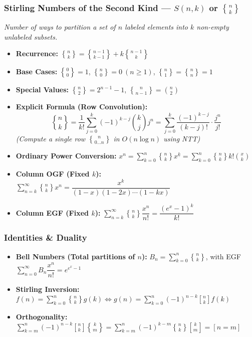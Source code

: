 \subsubsection*{Stirling Numbers of the Second Kind --- $S(n, k)$ or $\genfrac{\{}{\}}{0pt}{}{n}{k}$}
\textit{Number of ways to partition a set of $n$ labeled elements into $k$ non-empty unlabeled subsets.}
\begin{itemize}
    \item \textbf{Recurrence:} $\genfrac{\{}{\}}{0pt}{}{n}{k} = \genfrac{\{}{\}}{0pt}{}{n - 1}{k - 1} + k \genfrac{\{}{\}}{0pt}{}{n - 1}{k}$
    \item \textbf{Base Cases:} $\genfrac{\{}{\}}{0pt}{}{0}{0} = 1$, $\genfrac{\{}{\}}{0pt}{}{n}{0} = 0 \ (n \ge 1)$, $\genfrac{\{}{\}}{0pt}{}{n}{1} = \genfrac{\{}{\}}{0pt}{}{n}{n} = 1$
    \item \textbf{Special Values:} $\genfrac{\{}{\}}{0pt}{}{n}{2} = 2^{n - 1} - 1$, \quad $\genfrac{\{}{\}}{0pt}{}{n}{n - 1} = \binom{n}{2}$
    \item \textbf{Explicit Formula (Row Convolution):} 
    $$\genfrac{\{}{\}}{0pt}{}{n}{k} = \dfrac{1}{k!} \sum_{j = 0}^{k} (-1)^{k - j} \binom{k}{j} j^n = \sum_{j = 0}^{k} \dfrac{(-1)^{k - j}}{(k - j)!} \cdot \dfrac{j^n}{j!}$$
    \textit{(Compute a single row $\genfrac{\{}{\}}{0pt}{}{n}{0 \dots n}$ in $O(n \log n)$ using NTT)}
    \item \textbf{Ordinary Power Conversion:} $x^n = \sum_{k = 0}^{n} \genfrac{\{}{\}}{0pt}{}{n}{k} x^{\underline{k}} = \sum_{k = 0}^{n} \genfrac{\{}{\}}{0pt}{}{n}{k} k! \binom{x}{k}$
    \item \textbf{Column OGF (Fixed $k$):} $\sum_{n = k}^{\infty} \genfrac{\{}{\}}{0pt}{}{n}{k} x^n = \dfrac{x^k}{(1 - x)(1 - 2x)\cdots(1 - kx)}$
    \item \textbf{Column EGF (Fixed $k$):} $\sum_{n = k}^{\infty} \genfrac{\{}{\}}{0pt}{}{n}{k} \dfrac{x^n}{n!} = \dfrac{(e^x - 1)^k}{k!}$
\end{itemize}

\subsubsection*{Identities \& Duality}
\begin{itemize}
    \item \textbf{Bell Numbers (Total partitions of $n$):} $B_n = \sum_{k = 0}^{n} \genfrac{\{}{\}}{0pt}{}{n}{k}$, with EGF $\sum_{n = 0}^{\infty} B_n \dfrac{x^n}{n!} = e^{e^x - 1}$
    \item \textbf{Stirling Inversion:} $f(n) = \sum_{k = 0}^{n} \genfrac{\{}{\}}{0pt}{}{n}{k} g(k) \iff g(n) = \sum_{k = 0}^{n} (-1)^{n - k} \genfrac{[}{]}{0pt}{}{n}{k} f(k)$
    \item \textbf{Orthogonality:} $\sum_{k = m}^{n} (-1)^{n - k} \genfrac{[}{]}{0pt}{}{n}{k} \genfrac{\{}{\}}{0pt}{}{k}{m} = \sum_{k = m}^{n} (-1)^{k - m} \genfrac{\{}{\}}{0pt}{}{n}{k} \genfrac{[}{]}{0pt}{}{k}{m} = [n = m]$
\end{itemize}